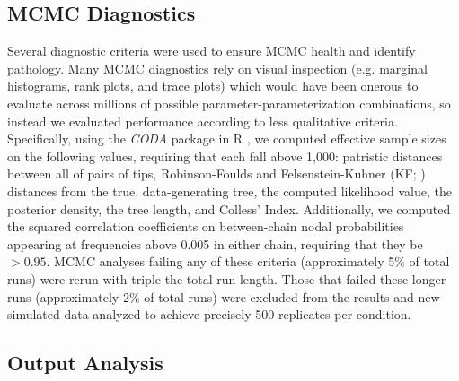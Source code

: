 \subsection{MCMC Diagnostics}
Several diagnostic criteria were used to ensure MCMC health and identify pathology. Many MCMC diagnostics rely on visual inspection (e.g. marginal histograms, rank plots, and trace plots) which would have been onerous to evaluate across millions of possible parameter-parameterization combinations, so instead we evaluated performance according to less qualitative criteria. Specifically, using the \textit{CODA} package \citep{plummerCODAConvergenceDiagnosis2006} in R \citep{rcoreteamLanguageEnvironmentStatistical2013}, we computed effective sample sizes on the following values, requiring that each fall above 1,000: patristic distances between all of pairs of tips, Robinson-Foulds \citep[RF][]{robinsonComparisonPhylogeneticTrees1981} and Felsenstein-Kuhner (KF; \citeyear{kuhnerSimulationComparisonPhylogeny1994}) distances from the true, data-generating tree, the computed likelihood value, the posterior density, the tree length, and Colless’ Index. Additionally, we computed the squared correlation coefficients on between-chain nodal probabilities appearing at frequencies above 0.005 in either chain, requiring that they be $> 0.95$. MCMC analyses failing any of these criteria (approximately 5\% of total runs) were rerun with triple the total run length. Those that failed these longer runs (approximately 2\% of total runs) were excluded from the results and new simulated data analyzed to achieve precisely 500 replicates per condition.

\subsection{Output Analysis}

